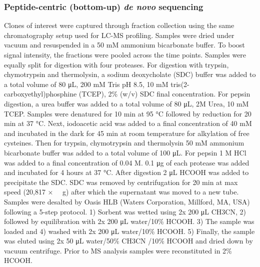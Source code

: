 \subsubsection{Peptide-centric (bottom-up) \emph{de novo} sequencing}
Clones of interest were captured through fraction collection using the same chromatography setup used for LC-MS profiling. Samples were dried under vacuum and resuspended in a 50 mM ammonium bicarbonate buffer. To boost signal intensity, the fractions were pooled across the time points. Samples were equally split for digestion with four proteases.
For digestion with trypsin, chymotrypsin and thermolysin, a sodium deoxycholate (SDC) buffer was added to a total volume of 80 μL, 200 mM Tris pH 8.5, 10 mM tris(2-carboxyethyl)phosphine (TCEP), 2\% (w/v) SDC final concentration. For pepsin digestion, a urea buffer was added to a total volume of 80 μL, 2M Urea, 10 mM TCEP. Samples were denatured for 10 min at 95 °C followed by reduction for 20 min at 37 °C. Next, iodoacetic acid was added to a final concentration of 40 mM and incubated in the dark for 45 min at room temperature for alkylation of free cysteines. Then for trypsin, chymotrypsin and thermolysin 50 mM ammonium bicarbonate buffer was added to a total volume of 100 μL. For pepsin 1 M HCl was added to a final concentration of 0.04 M. 0.1 μg of each protease was added and incubated for 4 hours at 37 °C. After digestion 2 μL HCOOH was added to precipitate the SDC. SDC was removed by centrifugation for 20 min at max speed (20,817 × ~~g) after which the supernatant was moved to a new tube.
Samples were desalted by Oasis HLB (Waters Corporation, Millford, MA, USA) following a 5-step protocol. 1) Sorbent was wetted using 2x 200 μL CH3CN, 2) followed by equilibration with 2x 200 μL water/10\% HCOOH. 3) The sample was loaded and 4) washed with 2x 200 μL water/10\% HCOOH. 5) Finally, the sample was eluted using 2x 50 μL water/50\% CH3CN /10\% HCOOH and dried down by vacuum centrifuge. Prior to MS analysis samples were reconstituted in 2\% HCOOH.

